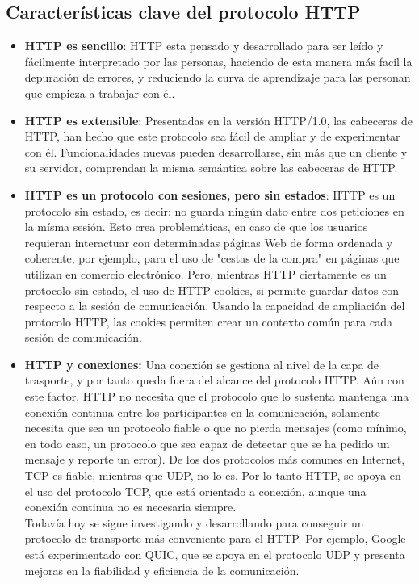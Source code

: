 \subsection{Características clave del protocolo HTTP}
\begin{itemize}
	\item \textbf{HTTP es sencillo}: HTTP esta pensado y desarrollado para ser leído y fácilmente interpretado por las personas, haciendo de esta manera más facil la depuración de errores, y reduciendo la curva de aprendizaje para las personan que empieza a trabajar con él.
	\item \textbf{HTTP es extensible}: Presentadas en la versión HTTP/1.0, las cabeceras de HTTP, han hecho que este protocolo sea fácil de ampliar y de experimentar con él. Funcionalidades nuevas pueden desarrollarse, sin más que un cliente y su servidor, comprendan la misma semántica sobre las cabeceras de HTTP.
	\item \textbf{HTTP es un protocolo con sesiones, pero sin estados}: HTTP es un protocolo sin estado, es decir: no guarda ningún dato entre dos peticiones en la mísma sesión. Esto crea problemáticas, en caso de que los usuarios requieran interactuar con determinadas páginas Web de forma ordenada y coherente, por ejemplo, para el uso de "cestas de la compra" en páginas que utilizan en comercio electrónico. Pero, mientras HTTP ciertamente es un protocolo sin estado, el uso de HTTP cookies, si permite guardar datos con respecto a la sesión de comunicación. Usando la capacidad de ampliación del protocolo HTTP, las cookies permiten crear un contexto común para cada sesión de comunicación.
	\item \textbf{HTTP y conexiones:} Una conexión se gestiona al nivel de la capa de trasporte, y por tanto queda fuera del alcance del protocolo HTTP. Aún con este factor, HTTP no necesita que el protocolo que lo sustenta mantenga una conexión continua entre los participantes en la comunicación, solamente necesita que sea un protocolo fiable o que no pierda mensajes (como mínimo, en todo caso, un protocolo que sea capaz de detectar que se ha pedido un mensaje y reporte un error). De los dos protocolos más comunes en Internet, TCP es fiable, mientras que UDP, no lo es. Por lo tanto HTTP, se apoya en el uso del protocolo TCP, que está orientado a conexión, aunque una conexión continua no es necesaria siempre. \\
	Todavía hoy se sigue investigando y desarrollando para conseguir un protocolo de transporte más conveniente para el HTTP. Por ejemplo, Google está experimentado con QUIC, que se apoya en el protocolo UDP y presenta mejoras en la fiabilidad y eficiencia de la comunicación. 
\end{itemize}
